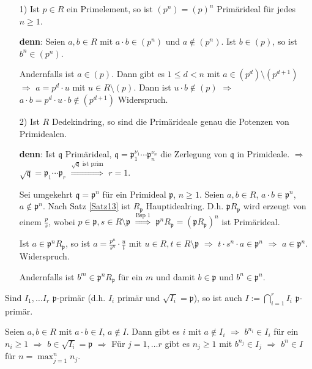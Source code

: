 \begin{nnBsp}
\begin{enumerate}
\item[1)] Ist $p \in R$ ein Primelement, so ist $(p^n) = (p)^n$ Primärideal für jedes $n \geq 1$.

\textbf{denn}: Seien $a, b \in R$ mit $a \cdot b \in (p^n)$ und $a \notin (p^n)$. Ist $b \in (p)$, so ist $b^n \in (p^n)$.

Andernfalls ist $a \in (p)$. Dann gibt es $1 \leq d < n$ mit $a \in (p^d) \setminus (p^{d+1})$ $\Rightarrow$ $a = p^d \cdot u$ mit $u \in R \setminus (p)$. Dann ist $u \cdot b \notin (p)$ $\Rightarrow$ $a \cdot b = p^d \cdot u \cdot b \notin (p^{d+1})$ Widerspruch.

\item[2)] Ist $R$ Dedekindring, so sind die Primärideale genau die Potenzen von Primidealen.

\textbf{denn}: Ist $\mathfrak{q}$ Primärideal, $\mathfrak{q} = \mathfrak{p}_1^{\nu_1} \cdots \mathfrak{p}_n^{\nu_n}$ die Zerlegung von $\mathfrak{q}$ in Primideale. $\Rightarrow$ $\sqrt{\mathfrak{q}} = \mathfrak{p}_1 \cdots \mathfrak{p}_r$ $\overset{\sqrt{\mathfrak{q}}\text{ ist prim}}\Rightarrow$ $r=1$.

Sei umgekehrt $\mathfrak{q} = \mathfrak{p}^n$ für ein Primideal $\mathfrak{p}$, $n \geq 1$. Seien $a, b \in R$, $a \cdot b \in \mathfrak{p}^n$, $a \notin \mathfrak{p}^n$. Nach Satz \ref{Satz13} ist $R_\mathfrak{p}$ Hauptidealring. D.h. $\mathfrak{p} R_\mathfrak{p}$ wird erzeugt von einem $\frac{p}{s}$, wobei $p \in \mathfrak{p}, s \in R \setminus \mathfrak{p}$ $\overset{\text{Bsp 1}}\Rightarrow$ $\mathfrak{p}^n R_\mathfrak{p} = (\mathfrak{p} R_\mathfrak{p})^n$ ist Primärideal.

Ist $a \in \mathfrak{p}^n R_\mathfrak{p}$, so ist $a = \frac{p^n}{s^n} \cdot \frac{u}{t}$ mit $u \in R, t \in R \setminus \mathfrak{p}$ $\Rightarrow$ $t \cdot s^n \cdot a \in \mathfrak{p}^n$ $\Rightarrow$ $a \in \mathfrak{p}^n$. Widerspruch.

Andernfalls ist $b^m \in \mathfrak{p}^n R_\mathfrak{p}$ für ein $m$ und damit $b \in \mathfrak{p}$ und $b^n \in \mathfrak{p}^n$.

\end{enumerate}
\end{nnBsp}

\begin{Bem}
Sind $I_1, \ldots I_r$ $\mathfrak{p}$-primär (d.h. $I_i$ primär und $\sqrt{I_i} = \mathfrak{p}$), so ist auch $I := \displaystyle\bigcap_{i=1}^{r} I_i$ $\mathfrak{p}$-primär.

\begin{Bew}
Seien $a,b \in R$ mit $a \cdot b \in I$, $a \notin I$. Dann gibt es $i$ mit $a \notin I_i$ $\Rightarrow$ $b^{n_i} \in I_i$ für ein $n_i \geq 1$ $\Rightarrow$ $b \in \sqrt{I_i} = \mathfrak{p}$ $\Rightarrow$ Für $j = 1, \ldots r$ gibt es $n_j \geq 1$ mit $b^{n_j} \in I_j$ $\Rightarrow$ $b^n \in I$ für $n = \max_{j=1}^{n} n_j$.

\end{Bew}
\end{Bem}

